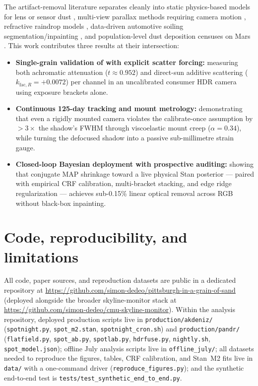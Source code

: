 \documentclass[11pt,a4paper]{article}
\newcommand{\code}[1]{\texttt{\small #1}}
\begin{document}
The artifact-removal literature separates cleanly into static physics-based models for
lens or sensor dust \citep{willson2005dust,zhou2007dust,gu2007dirtyglass,gu2009dirty},
multi-view parallax methods requiring camera motion \citep{xue2015obstruction},
refractive raindrop models \citep{you2016adherent}, data-driven automotive soiling
segmentation/inpainting \citep{uricar2019soiling}, and population-level dust deposition
censuses on Mars \citep{chenchen2023insight}. This work contributes three results at
their intersection:
\begin{itemize}
\item \textbf{Single-grain validation of \citet{gu2009dirty} with explicit scatter
  forcing:} measuring both achromatic attenuation ($t \approx 0.952$) and direct-sun
  additive scattering ($k_{\mathrm{fac},R} = +0.0072$) per channel in an uncalibrated
  consumer HDR camera using exposure brackets alone.
\item \textbf{Continuous 125-day tracking and mount metrology:} demonstrating that even
  a rigidly mounted camera violates the calibrate-once assumption by $>3\times$ the
  shadow's FWHM through viscoelastic mount creep ($\alpha = 0.34$), while turning the
  defocused shadow into a passive sub-millimetre strain gauge.
\item \textbf{Closed-loop Bayesian deployment with prospective auditing:} showing that
  conjugate MAP shrinkage toward a live physical Stan posterior --- paired with
  empirical CRF calibration, multi-bracket stacking, and edge ridge regularization ---
  achieves sub-0.15\% linear optical removal across RGB without black-box inpainting.
\end{itemize}

\section{Code, reproducibility, and limitations}
\label{sec:limitations}

{\sloppy
All code, paper sources, and reproduction datasets are public in a dedicated
repository at
\url{https://github.com/simon-dedeo/pittsburgh-in-a-grain-of-sand}
(deployed alongside the broader skyline-monitor stack at
\url{https://github.com/simon-dedeo/cmu-skyline-monitor}).
Within the analysis repository, deployed production scripts live in
\code{production/akdeniz/} (\code{spotnight.py}, \code{spot\_m2.stan},
\code{spotnight\_cron.sh}) and \code{production/pandr/} (\code{flatfield.py},
\code{spot\_ab.py}, \code{spotlab.py}, \code{hdrfuse.py}, \code{nightly.sh},
\code{spot\_model.json}); offline July analysis scripts live in
\code{offline\_july/}; all datasets needed to reproduce the figures, tables,
CRF calibration, and Stan~M2 fits live in \code{data/} with a one-command
driver (\code{reproduce\_figures.py}); and the synthetic end-to-end test is
\code{tests/test\_\allowbreak synthetic\_\allowbreak end\_\allowbreak to\_\allowbreak end.py}.
\par}
\end{document}

